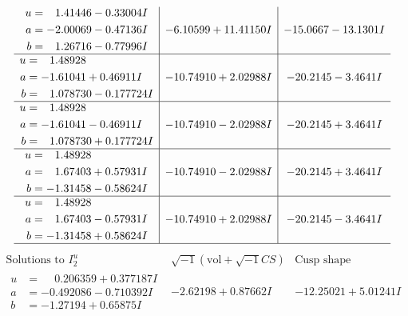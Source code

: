 \documentclass[1p]{elsarticle_modified}
\theoremstyle{definition}
\newcommand{\I}{\sqrt{-1}}
\begin{document}
$$\begin{array}{c|c|c}
\begin{aligned}
u &= \phantom{-}1.41446 - 0.33004 I \\
a &= -2.00069 - 0.47136 I \\
b &= \phantom{-}1.26716 - 0.77996 I\end{aligned}
 & -6.10599 + 11.41150 I & -15.0667 - 13.1301 I \\ \hline\begin{aligned}
u &= \phantom{-}1.48928\phantom{ +0.000000I} \\
a &= -1.61041 + 0.46911 I \\
b &= \phantom{-}1.078730 - 0.177724 I\end{aligned}
 & -10.74910 + 2.02988 I & -20.2145 - 3.4641 I \\ \hline\begin{aligned}
u &= \phantom{-}1.48928\phantom{ +0.000000I} \\
a &= -1.61041 - 0.46911 I \\
b &= \phantom{-}1.078730 + 0.177724 I\end{aligned}
 & -10.74910 - 2.02988 I & -20.2145 + 3.4641 I \\ \hline\begin{aligned}
u &= \phantom{-}1.48928\phantom{ +0.000000I} \\
a &= \phantom{-}1.67403 + 0.57931 I \\
b &= -1.31458 - 0.58624 I\end{aligned}
 & -10.74910 - 2.02988 I & -20.2145 + 3.4641 I \\ \hline\begin{aligned}
u &= \phantom{-}1.48928\phantom{ +0.000000I} \\
a &= \phantom{-}1.67403 - 0.57931 I \\
b &= -1.31458 + 0.58624 I\end{aligned}
 & -10.74910 + 2.02988 I & -20.2145 - 3.4641 I\\
 \hline 
 \end{array}$$\newpage$$\begin{array}{c|c|c}  
\text{Solutions to }I^u_{2}& \I (\text{vol} + \sqrt{-1}CS) & \text{Cusp shape}\\
 \hline 
\begin{aligned}
u &= \phantom{-}0.206359 + 0.377187 I \\
a &= -0.492086 - 0.710392 I \\
b &= -1.27194 + 0.65875 I\end{aligned}
 & -2.62198 + 0.87662 I & -12.25021 + 5.01241 I \\ \hline\begin{aligned}

\end{aligned}
\end{array}$$
\end{document}
